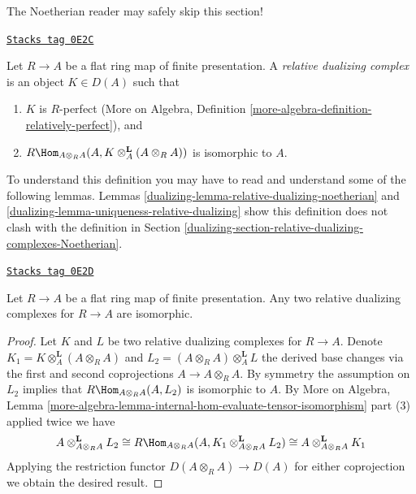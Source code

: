\medskip\noindent
The Noetherian reader may safely skip this section!

\begin{definition}
\label{dualizing-definition-relative-dualizing-complex}
\href{https://stacks.math.columbia.edu/tag/0E2C}{\texttt{Stacks tag 0E2C}}

Let $R \to A$ be a flat ring map of finite presentation.
A {\it relative dualizing complex} is an object $K \in D(A)$ such that
\begin{enumerate}
\item $K$ is $R$-perfect (More on Algebra, Definition
\ref{more-algebra-definition-relatively-perfect}), and
\item $R\Hom_{A \otimes_R A}(A, K \otimes_A^\mathbf{L} (A \otimes_R A))$
is isomorphic to $A$.
\end{enumerate}
\end{definition}

To understand this definition you may have to read and understand some
of the following lemmas. Lemmas \ref{dualizing-lemma-relative-dualizing-noetherian} and
\ref{dualizing-lemma-uniqueness-relative-dualizing} show this definition
does not clash with the definition in
Section \ref{dualizing-section-relative-dualizing-complexes-Noetherian}.

\begin{lemma}
\label{dualizing-lemma-uniqueness-relative-dualizing}
\href{https://stacks.math.columbia.edu/tag/0E2D}{\texttt{Stacks tag 0E2D}}

Let $R \to A$ be a flat ring map of finite presentation.
Any two relative dualizing complexes for $R \to A$ are isomorphic.
\end{lemma}

\begin{proof}
Let $K$ and $L$ be two relative dualizing complexes for $R \to A$.
Denote $K_1 = K \otimes_A^\mathbf{L} (A \otimes_R A)$
and $L_2 = (A \otimes_R A) \otimes_A^\mathbf{L} L$ the
derived base changes via the first and second coprojections
$A \to A \otimes_R A$. By symmetry the assumption on $L_2$
implies that $R\Hom_{A \otimes_R A}(A, L_2)$ is isomorphic to $A$.
By More on Algebra, Lemma
\ref{more-algebra-lemma-internal-hom-evaluate-tensor-isomorphism} part (3)
applied twice we have
$$
A \otimes_{A \otimes_R A}^\mathbf{L} L_2 \cong
R\Hom_{A \otimes_R A}(A, K_1 \otimes_{A \otimes_R A}^\mathbf{L} L_2) \cong
A \otimes_{A \otimes_R A}^\mathbf{L} K_1
$$
Applying the restriction functor $D(A \otimes_R A) \to D(A)$
for either coprojection we obtain the desired result.
\end{proof}

